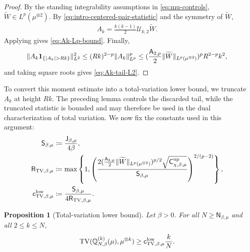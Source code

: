\documentclass[11pt,reqno]{amsart}
\numberwithin{equation}{section}
\theoremstyle{plain}
\newtheorem{prop}[prop]{Proposition}
\theoremstyle{remark}
\DeclarePairedDelimiter{\pa}{\lparen}{\rparen}
\DeclarePairedDelimiter{\norm}{\lVert}{\rVert}
\newcommand{\Q}{{\mathbb{Q}}}
\newcommand{\tl}{\widetilde}
\newcommand{\be}{\beta}
\newcommand{\TV}{\operatorname{TV}}
\newcommand{\one}{\mathbf 1}
\begin{document}
\begin{proof}
By the standing integrability assumptions in \eqref{eq:mu-controls}, \(\tl W\in L^p(\mu^{\otimes2})\).  By \eqref{eq:intro-centered-pair-statistic} and the symmetry of \(\tl W\),
\begin{align}\label{eq:Ak-as-ordered-U-statistic}
 A_k=\frac{k(k-1)}2\mathcal U_{k,2}\tl W.
\end{align}
Applying  gives \eqref{eq:Ak-Lp-bound}.  Finally,
\begin{align}\label{eq:Ak-tail-L2-squared}
 \norm{A_k\one_{\{|A_k|>Rk\}}}_{L^2}^2
 \le (Rk)^{2-p}\norm{A_k}_{L^p}^p
 \le \pa{\frac{\mathsf A_{2,p}}2\norm{\tl W}_{L^p(\mu^{\otimes2})}}^pR^{2-p}k^2,
\end{align}
and taking square roots gives \eqref{eq:Ak-tail-L2}.
\end{proof}

To convert this moment estimate into a total-variation lower bound, we truncate
\(A_k\) at height \(Rk\).  The preceding lemma controls the discarded tail,
while the truncated statistic is bounded and may therefore be used in the dual
characterization of total variation.  We now fix the constants used in this
argument:
\begin{align}
 \mathsf S_{\be,\mu}
 &\coloneqq \frac{\mathsf J_{\be,\mu}}{4\be},
 \label{eq:S-beta-mu-def}\\
 \mathsf R_{\TV,\be,\mu}
 &\coloneqq
 \max\left\{1,
 \left(\frac{
        2\pa{\frac{\mathsf A_{2,p}}2\norm{\tl W}_{L^p(\mu^{\otimes2})}}^{p/2}
        \sqrt{\mathsf C_{\chi,\be,\mu}^{\mathrm{up}}}}
       {\mathsf S_{\be,\mu}}
 \right)^{2/(p-2)}\right\},
 \label{eq:R-TV-def}\\
 \mathsf c_{\TV,\be,\mu}^{\mathrm{low}}
 &\coloneqq \frac{\mathsf S_{\be,\mu}}{4\mathsf R_{\TV,\be,\mu}} .
 \label{eq:c-TV-low-def}
\end{align}

\begin{prop}[Total-variation lower bound]\label{prop:TV-lower}
Let \(\be>0\).  For all \(N\ge \mathsf N_{\be,\mu}\) and all \(2\le k\le N\),
\begin{align}\label{eq:TV-lower-final}
 \TV\pa{\Q_{N,\be}^{(k)}(\mu),\mu^{\otimes k}}
 \ge \mathsf c_{\TV,\be,\mu}^{\mathrm{low}}\frac{k}{N}.
\end{align}
\end{prop}
\end{document}
